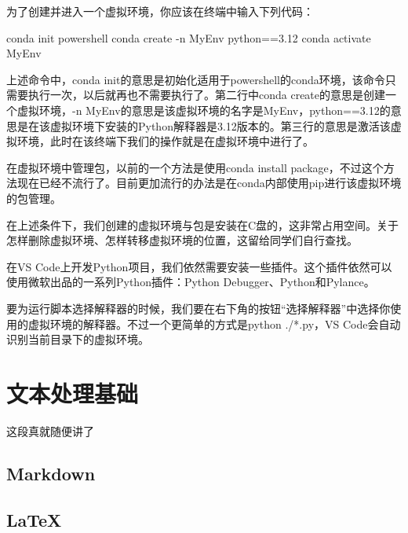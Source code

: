 \documentclass[12pt]{report}
\begin{document}
为了创建并进入一个虚拟环境，你应该在终端中输入下列代码：

\begin{codebox}
    conda init powershell
    conda create -n MyEnv python==3.12
    conda activate MyEnv
\end{codebox}

上述命令中，conda init的意思是初始化适用于powershell的conda环境，该命令只需要执行一次，以后就再也不需要执行了。第二行中conda create的意思是创建一个虚拟环境，-n MyEnv的意思是该虚拟环境的名字是MyEnv，python==3.12的意思是在该虚拟环境下安装的Python解释器是3.12版本的。第三行的意思是激活该虚拟环境，此时在该终端下我们的操作就是在虚拟环境中进行了。

在虚拟环境中管理包，以前的一个方法是使用conda install package，不过这个方法现在已经不流行了。目前更加流行的办法是在conda内部使用pip进行该虚拟环境的包管理。

在上述条件下，我们创建的虚拟环境与包是安装在C盘的，这非常占用空间。关于怎样删除虚拟环境、怎样转移虚拟环境的位置，这留给同学们自行查找。

在VS Code上开发Python项目，我们依然需要安装一些插件。这个插件依然可以使用微软出品的一系列Python插件：Python Debugger、Python和Pylance。

要为运行脚本选择解释器的时候，我们要在右下角的按钮“选择解释器”中选择你使用的虚拟环境的解释器。不过一个更简单的方式是python ./*.py，VS Code会自动识别当前目录下的虚拟环境。

\chapter{文本处理基础} %
\begin{codebox}
    这段真就随便讲了
\end{codebox}


\section{Markdown}

\section{LaTeX}
\end{document}
